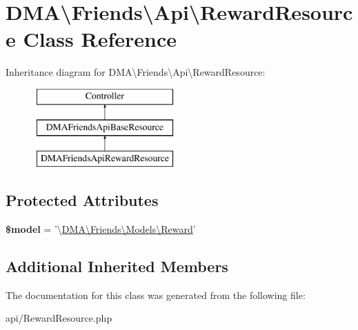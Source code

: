 \hypertarget{classDMA_1_1Friends_1_1Api_1_1RewardResource}{\section{D\-M\-A\textbackslash{}Friends\textbackslash{}Api\textbackslash{}Reward\-Resource Class Reference}
\label{classDMA_1_1Friends_1_1Api_1_1RewardResource}
}
Inheritance diagram for D\-M\-A\textbackslash{}Friends\textbackslash{}Api\textbackslash{}Reward\-Resource\-:\begin{figure}[H]
\begin{center}
\leavevmode
\includegraphics[height=3.000000cm]{d2/d30/classDMA_1_1Friends_1_1Api_1_1RewardResource}
\end{center}
\end{figure}
\subsection*{Protected Attributes}
\begin{DoxyCompactItemize}
\item 
\hypertarget{classDMA_1_1Friends_1_1Api_1_1RewardResource_a60661c07e9263496284122d8cd568f91}{{\bfseries \$model} = '\textbackslash{}\hyperlink{classDMA_1_1Friends_1_1Models_1_1Reward}{D\-M\-A\textbackslash{}\-Friends\textbackslash{}\-Models\textbackslash{}\-Reward}'}\label{classDMA_1_1Friends_1_1Api_1_1RewardResource_a60661c07e9263496284122d8cd568f91}

\end{DoxyCompactItemize}
\subsection*{Additional Inherited Members}


The documentation for this class was generated from the following file\-:\begin{DoxyCompactItemize}
\item 
api/Reward\-Resource.\-php\end{DoxyCompactItemize}
